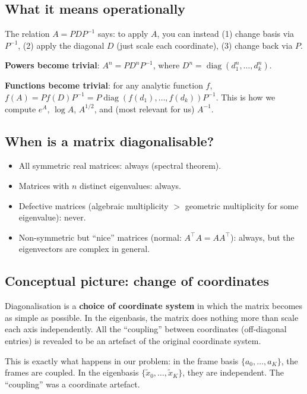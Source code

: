 \documentclass[11pt,a4paper]{article}
\newcommand{\diag}{\operatorname{diag}}
\begin{document}
\subsection{What it means operationally}

The relation $A = PDP^{-1}$ says: to apply $A$, you can instead (1) change basis via $P^{-1}$, (2) apply the diagonal $D$ (just scale each coordinate), (3) change back via $P$.

\textbf{Powers become trivial}: $A^n = PD^nP^{-1}$, where $D^n = \diag(d_1^n, \dots, d_k^n)$.

\textbf{Functions become trivial}: for any analytic function $f$, $f(A) = Pf(D)P^{-1} = P\diag(f(d_1), \dots, f(d_k))P^{-1}$.  This is how we compute $e^A$, $\log A$, $A^{1/2}$, and (most relevant for us) $A^{-1}$.

\subsection{When is a matrix diagonalisable?}

\begin{itemize}[nosep]
  \item All symmetric real matrices: always (spectral theorem).
  \item Matrices with $n$ distinct eigenvalues: always.
  \item Defective matrices (algebraic multiplicity $>$ geometric multiplicity for some eigenvalue): never.
  \item Non-symmetric but ``nice'' matrices (normal: $A^\top A = AA^\top$): always, but the eigenvectors are complex in general.
\end{itemize}

\subsection{Conceptual picture: change of coordinates}

Diagonalisation is a \textbf{choice of coordinate system} in which the matrix becomes as simple as possible.  In the eigenbasis, the matrix does nothing more than scale each axis independently.  All the ``coupling'' between coordinates (off-diagonal entries) is revealed to be an artefact of the original coordinate system.

This is exactly what happens in our problem: in the frame basis $\{a_0, \dots, a_K\}$, the frames are coupled.  In the eigenbasis $\{\tilde{x}_0, \dots, \tilde{x}_K\}$, they are independent.  The ``coupling'' was a coordinate artefact.
\end{document}
